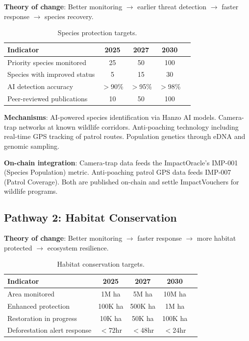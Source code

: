 \documentclass[11pt,letterpaper]{article}
\begin{document}
\textbf{Theory of change}: Better monitoring $\to$ earlier threat detection $\to$ faster response $\to$ species recovery.

\begin{table}[t]
\centering
\begin{tabular}{lcccc}
\toprule
\textbf{Indicator} & \textbf{2025} & \textbf{2027} & \textbf{2030} \\
\midrule
Priority species monitored & 25 & 50 & 100 \\
Species with improved status & 5 & 15 & 30 \\
AI detection accuracy & $>$90\% & $>$95\% & $>$98\% \\
Peer-reviewed publications & 10 & 50 & 100 \\
\bottomrule
\end{tabular}
\caption{Species protection targets.}
\label{tab:species}
\end{table}

\textbf{Mechanisms}: AI-powered species identification via Hanzo AI models. Camera-trap networks at known wildlife corridors. Anti-poaching technology including real-time GPS tracking of patrol routes. Population genetics through eDNA and genomic sampling.

\textbf{On-chain integration}: Camera-trap data feeds the ImpactOracle's IMP-001 (Species Population) metric. Anti-poaching patrol GPS data feeds IMP-007 (Patrol Coverage). Both are published on-chain and settle ImpactVouchers for wildlife programs.

\subsection{Pathway 2: Habitat Conservation}

\textbf{Theory of change}: Better monitoring $\to$ faster response $\to$ more habitat protected $\to$ ecosystem resilience.

\begin{table}[t]
\centering
\begin{tabular}{lcccc}
\toprule
\textbf{Indicator} & \textbf{2025} & \textbf{2027} & \textbf{2030} \\
\midrule
Area monitored & 1M ha & 5M ha & 10M ha \\
Enhanced protection & 100K ha & 500K ha & 1M ha \\
Restoration in progress & 10K ha & 50K ha & 100K ha \\
Deforestation alert response & $<$72hr & $<$48hr & $<$24hr \\
\bottomrule
\end{tabular}
\caption{Habitat conservation targets.}
\label{tab:habitat}
\end{table}
\end{document}
